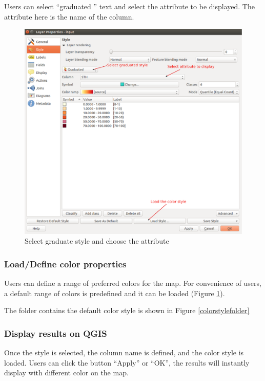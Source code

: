 \documentclass[12pt,oneside]{memoir}
\begin{document}
Users can select ``graduated '' text and select the attribute to be displayed. The attribute here is the name of the column.

\begin{figure}[H]
\centering
\includegraphics[scale=0.3]{propertyboxgraduate} 
\caption{Select graduate style and choose the attribute} 
\label{propertyboxgraduate}
\end{figure}

\subsubsection{Load/Define color properties}
Users can define a range of preferred colors for the map. For convenience of users, a default range of colors is predefined and it can be loaded (Figure \ref{propertyboxgraduate}).

The folder contains the default color style is shown in Figure \ref{colorstylefolder}
\subsubsection{Display results on QGIS}
Once the style is selected, the column name is defined, and the color style is loaded. Users can click the button ``Apply'' or ``OK'', the results will instantly display with different color on the map. 
\end{document}
